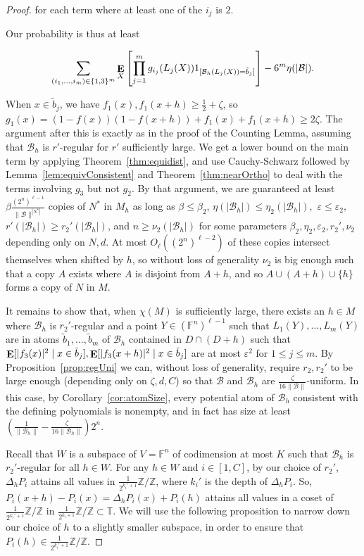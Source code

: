 \documentclass{article}
\theoremstyle{plain}
\theoremstyle{definition}
\theoremstyle{definition}
\theoremstyle{remark}
\numberwithin{equation}{section}
\newcommand{\FF}{\mathbb{F}}
\newcommand{\TT}{\mathbb{T}}
\newcommand{\ZZ}{\mathbb{Z}}
\newcommand{\Esymb}{{\bf E}}
\DeclareMathOperator*{\E}{\Esymb}
\newcommand{\cB}{\mathcal B}
\begin{document}
\begin{proof}
\noindent for each term where at least one of the $i_j$ is $2$.

Our probability is thus at least

\[\sum_{(i_1,\dots,i_m)\in \{1,3\}^m}\E_{X}\left[\prod_{j=1}^m g_{i_j}(L_j(X))1_{[\cB_h(L_j(X))=\tilde b_j]}\right]-6^m \eta(|\cB|).\]

When $x\in \tilde b_j$, we have $f_1(x),f_1(x+h)\geq \frac{1}{2}+\zeta$, so $g_1(x)=(1-f(x))(1-f(x+h))+f_1(x)+f_1(x+h) \geq 2\zeta$. The argument after this is exactly as in the proof of the Counting Lemma, assuming that $\cB_h$ is $r'$-regular for $r'$ sufficiently large. We get a lower bound on the main term by applying Theorem~\ref{thm:equidist}, and use Cauchy-Schwarz followed by Lemma~\ref{lem:equivConsistent} and Theorem~\ref{thm:nearOrtho} to deal with the terms involving $g_3$ but not $g_2$. By that argument, we are guaranteed at least $\beta \frac{(2^n)^{\ell-1}}{\|\cB\|^{|N^*|}}$ copies of $N^*$ in $M_h$ as long as $\beta\leq \beta_2$, $\eta(|\cB_h|)\leq \eta_2(|\cB_h|),$ $\varepsilon\leq \varepsilon_2,$ $r'(|\cB_h|)\geq r_2'(|\cB_h|)$, and $n\geq \nu_2(|\cB_h|)$ for some parameters $\beta_2,\eta_2,\varepsilon_2,r_2',\nu_2$ depending only on $N,d$. At most $O_\ell((2^n)^{\ell-2})$ of these copies intersect themselves when shifted by $h$, so without loss of generality $\nu_2$ is big enough such that a copy $A$ exists where $A$ is disjoint from $A+h$, and so $A\cup (A+h)\cup \{h\}$ forms a copy of $N$ in $M$.

It remains to show that, when $\chi(M)$ is sufficiently large, there exists an $h\in M$ where $\cB_h$ is $r_2'$-regular and a point $Y\in (\FF^n)^{\ell-1}$ such that $L_1(Y),\dots,L_m(Y)$ are in atoms $\tilde b_1,\dots,\tilde b_m$ of $\cB_h$ contained in $D\cap (D+h)$ such that $\E[|f_3(x)|^2 \mid x\in \tilde b_j],\E[|f_3(x+h)|^2 \mid x\in \tilde b_j]$ are at most $\varepsilon^2$ for $1\leq j\leq m$. By Proposition~\ref{prop:regUni} we can, without loss of generality, require $r_2, r_2'$ to be large enough (depending only on $\zeta,d,C$) so that $\cB$ and $\cB_h$ are $\frac{\zeta}{16\|\cB\|}$-uniform. In this case, by Corollary~\ref{cor:atomSize}, every potential atom of $\cB_h$ consistent with the defining polynomials is nonempty, and in fact has size at least $\left(\frac{1}{\|\cB_h\|}-\frac{\zeta}{16\|\cB_h\|}\right)2^n$.

Recall that $W$ is a subspace of $V=\FF^n$ of codimension at most $K$ such that $\cB_h$ is $r_2'$-regular for all $h\in W$. For any $h\in W$ and $i\in[1,C]$, by our choice of $r_2'$, $\Delta_h P_i$ attains all values in $\frac{1}{2^{k_i'+1}}\ZZ/\ZZ$, where $k_i'$ is the depth of $\Delta_h P_i$. So, $P_i(x+h)-P_i(x)=\Delta_h P_i(x)+P_i(h)$ attains all values in a coset of $\frac{1}{2^{k_i'+1}}\ZZ/\ZZ$ in $\frac{1}{2^{k_i+1}}\ZZ/\ZZ\subset \TT$. We will use the following proposition to narrow down our choice of $h$ to a slightly smaller subspace, in order to ensure that $P_i(h)\in \frac{1}{2^{k_i'+1}}\ZZ/\ZZ$.


\end{proof}
\end{document}
